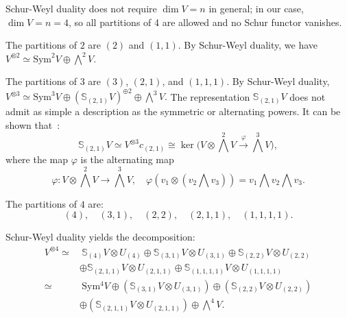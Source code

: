 \documentclass{amsart}
\begin{document}
\begin{remark}
Schur-Weyl duality does not require $\dim V = n$ in general; in our case, $\dim V = n = 4$, so all partitions of 4 are allowed and no Schur functor vanishes.
\end{remark}


\begin{example}
The partitions of \(2\) are \((2)\) and \((1,1)\). By Schur-Weyl duality, we have
$V^{\otimes 2} \simeq \mathrm{Sym}^2 V \oplus \bigwedge^2 V.$

\end{example}

\begin{example}
The partitions of \(3\) are \((3)\), \((2,1)\), and \((1,1,1)\). By Schur-Weyl duality,
$ V^{\otimes 3} \simeq \mathrm{Sym}^3 V \oplus (\mathbb{S}_{(2,1)} V)^{\oplus 2} \oplus \bigwedge^3 V.$
The representation \(\mathbb{S}_{(2,1)} V\) does not admit as simple a description as the symmetric or alternating powers. It can be shown that~\cite[page 76]{fulton1991representation}:
\[
\mathbb{S}_{(2,1)} V \simeq V^{\otimes 3} c_{(2,1)} \cong \ker \bigl( V \otimes \bigwedge^2 V \xrightarrow{\varphi} \bigwedge^3 V \bigr),
\]
where the map \(\varphi\) is the alternating map
\[
\varphi : V \otimes \bigwedge^2 V \to \bigwedge^3 V, \quad \varphi(v_1 \otimes (v_2 \bigwedge v_3)) = v_1 \bigwedge v_2 \bigwedge v_3.
\]
\end{example}

\begin{example}
The partitions of \(4\) are:
\[
(4), \quad (3,1), \quad (2,2), \quad (2,1,1), \quad (1,1,1,1).
\]

Schur-Weyl duality yields the decomposition:
\[
\begin{aligned}
V^{\otimes 4} \simeq &\ \mathbb{S}_{(4)} V \otimes U_{(4)} \oplus \mathbb{S}_{(3,1)} V \otimes U_{(3,1)} \oplus \mathbb{S}_{(2,2)} V \otimes U_{(2,2)} \\
&\oplus \mathbb{S}_{(2,1,1)} V \otimes U_{(2,1,1)} \oplus \mathbb{S}_{(1,1,1,1)} V \otimes U_{(1,1,1,1)} \\
 \simeq &\ \mathrm{Sym^4} V  \oplus (\mathbb{S}_{(3,1)} V \otimes U_{(3,1)}) \oplus (\mathbb{S}_{(2,2)} V \otimes U_{(2,2)}) \\
&\oplus (\mathbb{S}_{(2,1,1)} V \otimes U_{(2,1,1)}) \oplus 
\bigwedge^4 V. 
\end{aligned}
\]
\end{example}
\end{document}
